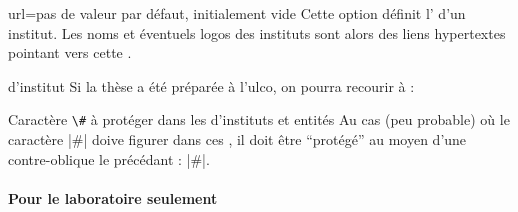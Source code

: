 %
\begin{docKey}{url}{=}{pas de valeur par défaut, initialement vide}
  Cette option définit l' d'un institut. Les noms et éventuels
  logos des instituts sont alors des liens hypertextes pointant vers cette
  .
  \begin{dbexample}{ d'institut}{}
    Si la thèse a été préparée à l'\gls{ulco}, on pourra recourir à :%
    \NoAutoSpacing%
\begin{preamblecode}[listing
options={deletekeywords={url},morekeywords={[2]url},deletekeywords={[5]institute}}]
\end{preamblecode}
\end{dbexample}
%
\begin{dbwarning}{Caractère \protect\lstinline+\#+ à protéger dans les
     d'instituts et entités}{}
  Au cas (peu probable) où le caractère |#| doive figurer dans ces
  , il doit être \enquote{protégé} au moyen d'une
  contre-oblique le précédant : |\#|.
\end{dbwarning}
\end{docKey}

\paragraph{Pour le laboratoire seulement}

